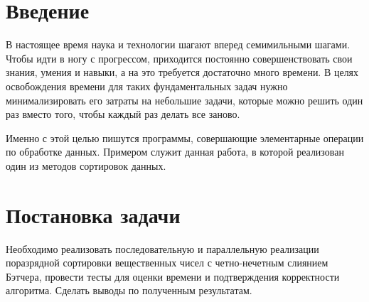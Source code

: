 \documentclass{report}
\begin{document}
	\setcounter{page}{2}
	
	\tableofcontents
	\newpage
	
	\section*{Введение}
	В настоящее время наука и технологии шагают вперед семимильными шагами. Чтобы идти в ногу с прогрессом, приходится постоянно совершенствовать свои знания, умения и навыки, а на это требуется достаточно много времени. В целях освобождения времени для таких фундаментальных задач нужно минимализировать его затраты на небольшие задачи, которые можно решить один раз вместо того, чтобы каждый раз делать все заново.
	\par Именно с этой целью пишутся программы, совершающие элементарные операции по обработке данных. Примером служит данная работа, в которой реализован один из методов сортировок данных.
	\newpage
	
	\section*{Постановка задачи}
	Необходимо реализовать последовательную и параллельную реализации поразрядной сортировки вещественных чисел с четно-нечетным слиянием Бэтчера, провести тесты для оценки времени и подтверждения корректности алгоритма. Сделать выводы по полученным результатам.
	\newpage
	
\end{document}
